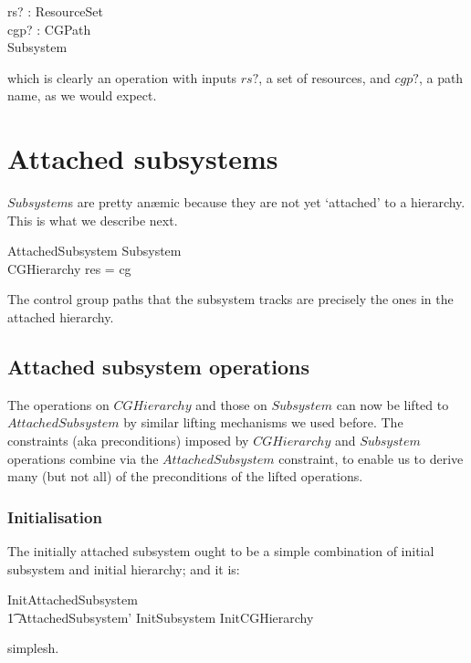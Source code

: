 \documentclass[a4paper,twoside,12pt]{article}
\begin{document}
\begin{schema*}
rs? : ResourceSet\\
cgp? : CGPath\\
\Delta Subsystem
\end{schema*}
which is clearly an operation with inputs $rs?$, a set of resources, and $cgp?$, a path name, as we would expect.

\section{Attached subsystems}
$Subsystem$s are pretty an\ae{}mic because they are not yet `attached' to a hierarchy. This is what we describe next.

\begin{schema}{AttachedSubsystem}
Subsystem \\
CGHierarchy
\where
\dom res = \dom cg
\end{schema}
The control group paths that the subsystem tracks are precisely the ones in
the attached hierarchy. 

\subsection{Attached subsystem operations}
The operations on $CGHierarchy$ and those on $Subsystem$ can now be lifted to $AttachedSubsystem$
by similar lifting mechanisms we used before. The constraints (aka preconditions) imposed 
by $CGHierarchy$ and $Subsystem$ operations combine via the
$AttachedSubsystem$ constraint, to enable us to derive many (but not all) of the preconditions of the lifted operations.

\subsubsection{Initialisation}

The initially attached subsystem ought to be a simple combination of initial subsystem and initial hierarchy; and it is:

\begin{zed}
InitAttachedSubsystem  \\
\t1 AttachedSubsystem' \land InitSubsystem \land InitCGHierarchy
\end{zed}
simplesh.
\end{document}
